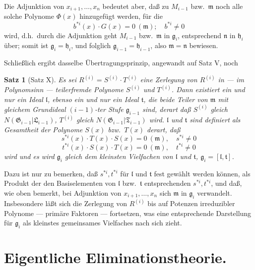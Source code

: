 \documentclass[fontsize=10pt,paper=a5,pagesize,headings=small]{scrbook}
\newcommand{\ideal}[1]{\mathfrak{#1}}
\theoremstyle{plain}
\newtheorem*{satz}{Satz}
\begin{document}
Die Adjunktion von $x_{i+1},\dots,x_n$ bedeutet aber, daß zu $M_{i-1}$ bzw.~$\ideal{m}$ noch alle
solche Polynome $\Phi(x)$ hinzugefügt werden, für die
\[ b^{*i}(x) \cdot G(x) = 0\ (\ideal{m});\quad b^{*i} \neq 0 \]
wird, d.h.~durch die Adjunktion geht $M_{i-1}$ bzw.~$\ideal{m}$ in $\ideal{g}_i$, entsprechend $\ideal{n}$ in $\ideal{h}_i$
über; somit ist $\ideal{g}_i = \ideal{h}_i$, und folglich $\ideal{g}_{i-1} = \ideal{h}_{i-1}$, also $\ideal{m} = \ideal{n}$ bewiesen.

\newpage
\setcounter{page}{444}

Schließlich ergibt dasselbe Übertragungsprinzip, angewandt auf Satz V, noch

\begin{satz}[Satz X]
Es sei $R^{(i)} = S^{(i)} \cdot T^{(i)}$ eine Zerlegung von $R^{(i)}$ in --- im Polynomsinn --- teilerfremde
Polynome $S^{(i)}$ und $T^{(i)}$. Dann existiert ein und nur ein Ideal $\ideal{l}$, ebenso ein und nur
ein Ideal $\ideal{t}$, die beide Teiler von $\ideal{m}$ mit gleichem Grundideal $(i-1)$-ter Stufe
$\ideal{g}_{i-1}$ sind, derart daß $S^{(i)}$ gleich $N(\mathfrak{G}_{i-1}|\mathfrak{L}_{i-1})$, $T^{(i)}$ gleich
$N(\mathfrak{G}_{i-1}|\mathfrak{T}_{i-1})$ wird. $\ideal{l}$ und $\ideal{t}$ sind definiert als Gesamtheit der Polynome $S(x)$ bzw.~$T(x)$
derart, daß
\[ s^{*i}(x) \cdot T(x) \cdot S(x) = 0\ (\ideal{m}),\quad s^{*i} \neq 0 \]
\[ t^{*i}(x) \cdot S(x) \cdot T(x) = 0\ (\ideal{m}),\quad t^{*i} \neq 0 \]
wird und es wird $\ideal{g}_i$ gleich dem kleinsten Vielfachen von $\ideal{l}$ und $\ideal{t}$, $\ideal{g}_i = [\ideal{l}, \ideal{t}]$.
\end{satz}

Dazu ist nur zu bemerken, daß $s^{*i}, t^{*i}$ für $\ideal{l}$ und $\ideal{t}$ fest gewählt werden können, als
Produkt der den Basiselementen von $\ideal{l}$ bzw.~$\ideal{t}$ entsprechenden $s^{*i}, t^{*i}$, und daß, wie oben
bemerkt, bei Adjunktion von $x_{i+1},\dots,x_n$ sich $\ideal{m}$ in $\ideal{g}_i$ verwandelt. Insbesondere läßt
sich die Zerlegung von $R^{(i)}$ bis auf Potenzen irreduzibler Polynome --- primäre
Faktoren --- fortsetzen, was eine entsprechende Darstellung für $\ideal{g}_i$ als kleinstes gemeinsames
Vielfaches nach sich zieht.

\section{Eigentliche Eliminationstheorie.}
\setcounter{section}{6}
\end{document}
